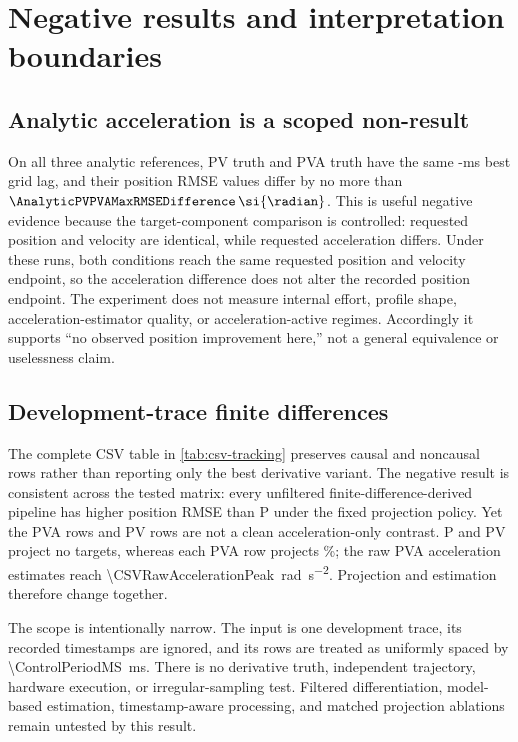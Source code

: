 \section{Negative results and interpretation boundaries}
\label{app:negative-results}

\subsection{Analytic acceleration is a scoped non-result}

On all three analytic references, PV truth and PVA truth have the same
\AnalyticPVLagMS{}-ms best grid lag, and their position RMSE values differ by no
more than \(\AnalyticPVPVAMaxRMSEDifference\,\si{\radian}\).  This is useful negative
evidence because the target-component comparison is controlled: requested
position and velocity are identical, while requested acceleration differs.
Under these runs, both conditions reach the same requested position and
velocity endpoint, so the acceleration difference does not alter the recorded
position endpoint.  The experiment does not measure internal effort, profile
shape, acceleration-estimator quality, or acceleration-active regimes.
Accordingly it supports ``no observed position improvement here,'' not a
general equivalence or uselessness claim.

\subsection{Development-trace finite differences}

The complete CSV table in \cref{tab:csv-tracking} preserves causal and
noncausal rows rather than reporting only the best derivative variant.  The
negative result is consistent across the tested matrix: every unfiltered
finite-difference-derived pipeline has higher position RMSE than P under the
fixed projection policy.  Yet the PVA rows and PV rows are not a clean
acceleration-only contrast.  P and PV project no targets, whereas each PVA row
projects \CSVProjectionRate\%; the raw PVA acceleration estimates reach
\SI{\CSVRawAccelerationPeak}{\radian\per\second\squared}.  Projection and
estimation therefore change together.

The scope is intentionally narrow.  The input is one development trace, its
recorded timestamps are ignored, and its rows are treated as uniformly spaced
by \SI{\ControlPeriodMS}{\milli\second}.  There is no derivative truth,
independent trajectory, hardware execution, or irregular-sampling test.
Filtered differentiation, model-based estimation, timestamp-aware processing,
and matched projection ablations remain untested by this result.

